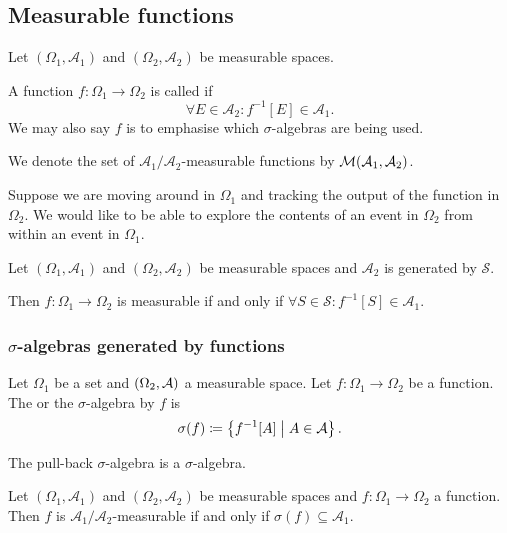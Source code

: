 \subsection{Measurable functions}
\begin{definition}
Let $(\Omega_1, \mathcal{A}_1)$ and $(\Omega_2, \mathcal{A}_2)$ be measurable spaces.

A function $f:\Omega_1 \to \Omega_2$ is called  if
\[ \forall E\in\mathcal{A}_2: f^{-1}[E] \in\mathcal{A}_1. \]
We may also say $f$ is  to emphasise which $\sigma$-algebras are being used.

We denote the set of $\mathcal{A}_1/\mathcal{A}_2$-measurable functions by $\operatorname{\mathcal{M}}(\mathcal{A}_1, \mathcal{A}_2)$.
\end{definition}
Suppose we are moving around in $\Omega_1$ and tracking the output of the function in $\Omega_2$. We would like to be able to explore the contents of an event in $\Omega_2$ from within an event in $\Omega_1$.

\begin{lemma} \label{measurableFromGeneratingSet}
Let $(\Omega_1, \mathcal{A}_1)$ and $(\Omega_2, \mathcal{A}_2)$ be measurable spaces and $\mathcal{A}_2$ is generated by $\mathcal{S}$.

Then $f: \Omega_1\to \Omega_2$ is measurable \textup{if and only if} $\forall S\in\mathcal{S}: f^{-1}[S] \in \mathcal{A}_1$.
\end{lemma}

\subsubsection{$\sigma$-algebras generated by functions}
\begin{definition}
Let $\Omega_1$ be a set and $\left( \Omega_2, \mathcal{A} \right)$ a measurable space. Let $f: \Omega_1\to \Omega_2$ be a function. The  or the $\sigma$-algebra  by $f$ is
\[ \sigma(f) \coloneqq \left\{ f^{-1}[A] \;\middle|\; A\in \mathcal{A} \right\}. \]
\end{definition}

The pull-back $\sigma$-algebra is a $\sigma$-algebra.

\begin{lemma}
Let $(\Omega_1, \mathcal{A}_1)$ and $(\Omega_2, \mathcal{A}_2)$ be measurable spaces and $f: \Omega_1\to \Omega_2$ a function. Then $f$ is $\mathcal{A}_1/\mathcal{A}_2$-measurable \textup{if and only if} $\sigma(f) \subseteq \mathcal{A}_1$.
\end{lemma}

